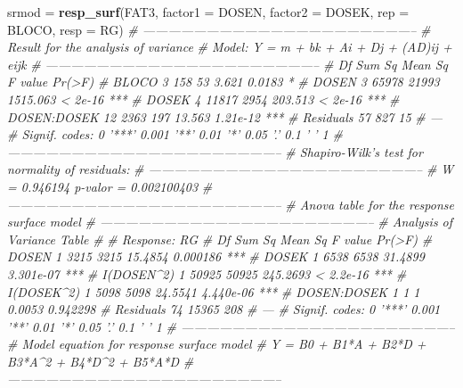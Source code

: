 \documentclass[
]{book}
\newenvironment{Shaded}{\begin{snugshade}}{\end{snugshade}}
\newcommand{\CommentTok}[1]{\textcolor[rgb]{0.56,0.35,0.01}{\textit{#1}}}
\newcommand{\DataTypeTok}[1]{\textcolor[rgb]{0.13,0.29,0.53}{#1}}
\newcommand{\KeywordTok}[1]{\textcolor[rgb]{0.13,0.29,0.53}{\textbf{#1}}}
\newcommand{\NormalTok}[1]{#1}
\newcommand{\StringTok}[1]{\textcolor[rgb]{0.31,0.60,0.02}{#1}}
\begin{document}
\begin{Shaded}
\begin{Highlighting}[]
\NormalTok{srmod =}\StringTok{  }\KeywordTok{resp_surf}\NormalTok{(FAT3,}
                   \DataTypeTok{factor1 =}\NormalTok{ DOSEN,}
                   \DataTypeTok{factor2 =}\NormalTok{ DOSEK,}
                   \DataTypeTok{rep =}\NormalTok{ BLOCO,}
                   \DataTypeTok{resp =}\NormalTok{ RG)}
\CommentTok{# -----------------------------------------------------------------}
\CommentTok{# Result for the analysis of variance }
\CommentTok{# Model: Y = m + bk + Ai + Dj + (AD)ij + eijk }
\CommentTok{# -----------------------------------------------------------------}
\CommentTok{#             Df Sum Sq Mean Sq  F value   Pr(>F)    }
\CommentTok{# BLOCO        3    158      53    3.621   0.0183 *  }
\CommentTok{# DOSEN        3  65978   21993 1515.063  < 2e-16 ***}
\CommentTok{# DOSEK        4  11817    2954  203.513  < 2e-16 ***}
\CommentTok{# DOSEN:DOSEK 12   2363     197   13.563 1.21e-12 ***}
\CommentTok{# Residuals   57    827      15                      }
\CommentTok{# ---}
\CommentTok{# Signif. codes:  0 '***' 0.001 '**' 0.01 '*' 0.05 '.' 0.1 ' ' 1}
\CommentTok{# -----------------------------------------------------------------}
\CommentTok{# Shapiro-Wilk's test for normality of residuals: }
\CommentTok{# -----------------------------------------------------------------}
\CommentTok{# W =  0.946194 p-valor =  0.002100403 }
\CommentTok{# -----------------------------------------------------------------}
\CommentTok{# Anova table for the response surface model }
\CommentTok{# -----------------------------------------------------------------}
\CommentTok{# Analysis of Variance Table}
\CommentTok{# }
\CommentTok{# Response: RG}
\CommentTok{#             Df Sum Sq Mean Sq  F value    Pr(>F)    }
\CommentTok{# DOSEN        1   3215    3215  15.4854  0.000186 ***}
\CommentTok{# DOSEK        1   6538    6538  31.4899 3.301e-07 ***}
\CommentTok{# I(DOSEN^2)   1  50925   50925 245.2693 < 2.2e-16 ***}
\CommentTok{# I(DOSEK^2)   1   5098    5098  24.5541 4.440e-06 ***}
\CommentTok{# DOSEN:DOSEK  1      1       1   0.0053  0.942298    }
\CommentTok{# Residuals   74  15365     208                       }
\CommentTok{# ---}
\CommentTok{# Signif. codes:  0 '***' 0.001 '**' 0.01 '*' 0.05 '.' 0.1 ' ' 1}
\CommentTok{# -----------------------------------------------------------------}
\CommentTok{# Model equation for response surface model }
\CommentTok{# Y = B0 + B1*A + B2*D + B3*A^2 + B4*D^2 + B5*A*D }
\CommentTok{# -----------------------------------------------------------------}

\end{Highlighting}
\end{Shaded}
\end{document}
